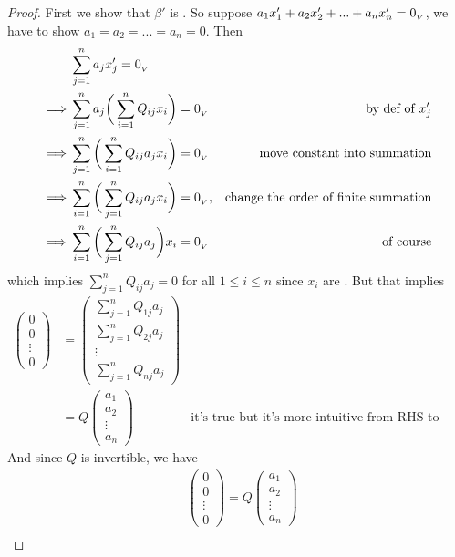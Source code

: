 \begin{proof}
First we show that \(\beta'\) is \LID{}.
So suppose \(a_1 x'_1 + a_2 x'_2 + ... + a_n x'_n = 0_{_V}\), we have to show \(a_1 = a_2 = ... = a_n = 0\).
Then
\begin{align*}
             & \sum_{j = 1}^n a_j x'_j = 0_{_V} \\
    \implies & \sum_{j = 1}^n a_j \bigg( \sum_{i = 1}^n Q_{ij} x_i \bigg) = 0_{_V} & \text{by def of \(x'_j\)} \\
    \implies & \sum_{j = 1}^n \bigg( \sum_{i = 1}^n Q_{ij} a_j x_i \bigg) = 0_{_V} & \text{move constant into summation} \\
    \implies & \sum_{i = 1}^n \bigg( \sum_{j = 1}^n Q_{ij} a_j x_i \bigg) = 0_{_V}, & \text{change the order of finite summation} \\
    \implies & \sum_{i = 1}^n \bigg( \sum_{j = 1}^n Q_{ij} a_j \bigg) x_i = 0_{_V} & \text{of course}
\end{align*}
which implies \(\sum_{j = 1}^n Q_{ij} a_j = 0\) for all \(1 \le i \le n\) since \(x_i\) are \LID{}.
But that implies
\begin{align*}
    \begin{pmatrix} 0 \\ 0 \\ \vdots \\ 0 \end{pmatrix}
    & = \begin{pmatrix}
        \sum_{j = 1}^n Q_{1j} a_j \\
        \sum_{j = 1}^n Q_{2j} a_j \\
        \vdots \\
        \sum_{j = 1}^n Q_{nj} a_j
    \end{pmatrix} \\
    & = Q \begin{pmatrix} a_1 \\ a_2 \\ \vdots \\ a_n \end{pmatrix} & \text{it's true but it's more intuitive from RHS to LHS}
\end{align*}
And since \(Q\) is invertible, we have
\begin{align*}
             & \begin{pmatrix} 0 \\ 0 \\ \vdots \\ 0 \end{pmatrix}
    = Q \begin{pmatrix} a_1 \\ a_2 \\ \vdots \\ a_n \end{pmatrix} \\

\end{align*}
\end{proof}
